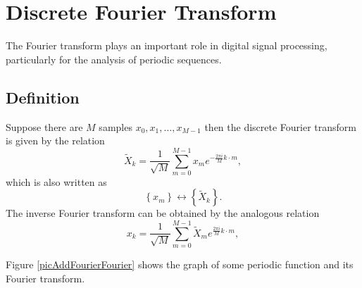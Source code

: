 \section{Discrete Fourier Transform}
\label{AddFourier}

The Fourier transform plays an important
role in digital signal processing, particularly for the analysis
of periodic sequences.
\subsection{Definition}
\begin{definition}
Suppose there are $M$ samples $x_0, x_1, \dots, x_{M-1}$ then
the discrete Fourier transform is given by the relation
\begin{equation}
\tilde{X}_k = \frac{1}{\sqrt{M}}\sum^{M - 1}_{m = 0} x_m e^{-\frac{2 \pi i}{M} k\cdot m},
\label{eqAddFourierDiscretFourier}
\end{equation}
which is also written as
\begin{equation}
\left\{x_m\right\} \longleftrightarrow \left\{\tilde{X}_k\right\}.
\nonumber
\end{equation}
The inverse Fourier transform can be obtained by the
analogous relation
\begin{equation}
x_k = \frac{1}{\sqrt{M}}\sum^{M - 1}_{m = 0} \tilde{X}_m e^{\frac{2 \pi i}{M} k\cdot m},
\nonumber
\end{equation}
\end{definition}

Figure \autoref{picAddFourierFourier} shows the graph of some
periodic function and its Fourier transform. 




